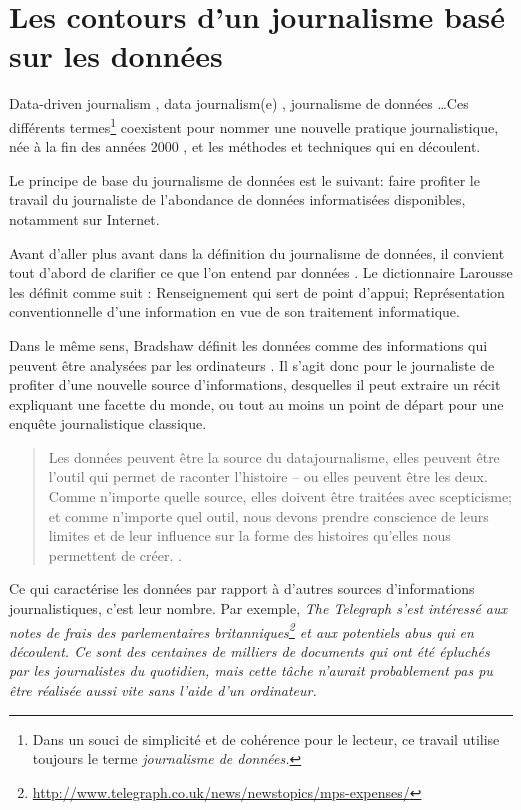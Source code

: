 
\chapter{Les contours d'un journalisme basé sur les données}


\og Data-driven journalism \fg, \og data journalism(e) \fg, \og journalisme de données
 \fg\dots Ces différents 
termes\footnote{Dans un souci de simplicité et de cohérence pour le lecteur, ce travail
utilise toujours 
le terme \em journalisme de données\em.} 
coexistent pour nommer une nouvelle pratique journalistique, née à la fin des années 2000 \cite{bradshaw}, et les 
méthodes et techniques qui en découlent. 

Le principe de base du journalisme de données est le suivant: faire profiter le travail 
du journaliste de l'abondance de données informatisées disponibles, notamment sur 
Internet. 

Avant d'aller plus avant dans la définition du journalisme de données, il convient tout
d'abord de clarifier ce que l'on entend par \og données \fg.
Le dictionnaire Larousse les définit comme suit : \og Renseignement qui sert de point 
d'appui; Représentation conventionnelle d'une information en vue de son traitement 
informatique.\fg

Dans le même sens, Bradshaw définit les données comme \og des informations qui peuvent 
être analysées par les ordinateurs \fg \cite{bradshaw}. Il s'agit donc pour le 
journaliste de profiter d'une nouvelle source d'informations, desquelles il 
peut extraire un récit expliquant une facette du monde, ou tout au moins un 
point de départ pour une enquête journalistique classique. 


\begin{quote}
\og Les données peuvent être la source du datajournalisme, elles peuvent être l'outil 
qui permet de raconter l'histoire -- ou elles peuvent être les deux. 
Comme n'importe quelle source, elles doivent être traitées avec scepticisme; et comme 
n'importe quel outil, nous devons prendre conscience de leurs limites et de leur 
influence sur la forme des histoires qu'elles nous permettent de créer. \fg  %
\cite{handbookfr}.
\end{quote}

Ce qui caractérise les données par rapport à d'autres sources d'informations 
journalistiques, c'est leur nombre. Par exemple, \em The Telegraph \em s'est 
intéressé aux notes de frais des parlementaires britanniques\footnote{\url{http://www.telegraph.co.uk/news/newstopics/mps-expenses/}} 
et aux potentiels abus qui en 
découlent. Ce sont des centaines de milliers de documents qui ont été épluchés par les 
journalistes du quotidien, mais cette tâche n'aurait probablement pas pu être
réalisée aussi vite sans l'aide d'un ordinateur.

